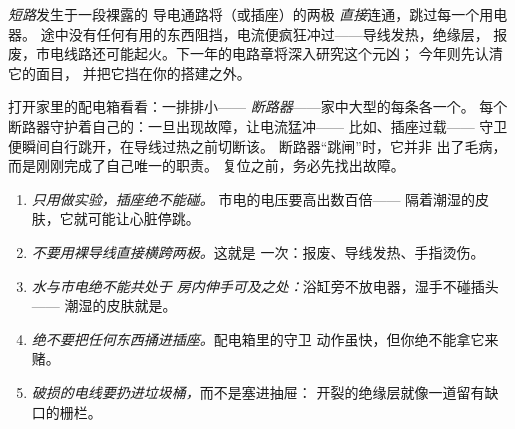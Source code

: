 \begin{definition}[短路]\label{def:g6:circuits-and-safety:short}
\emph{短路}发生于一段裸露的
导电通路将（或插座）的两极
\emph{直接}连通，跳过每一个用电器。
途中没有任何有用的东西阻挡，电流便疯狂冲过——导线发热，绝缘层，
报废，市电线路还可能起火。下一年的电路章将深入研究这个元凶；
今年则先认清它的面目，
并把它挡在你的搭建之外。
\end{definition}

\begin{remark}[家中的守卫]\label{rem:g6:circuits-and-safety:guards}
打开家里的配电箱看看：一排排小——
\emph{断路器}——家中大型的每条各一个。
每个断路器守护着自己的：一旦出现故障，让电流猛冲——
比如、插座过载——
守卫便瞬间自行跳开，在导线过热之前切断该。
断路器“跳闸”时，它并非
出了毛病，而是刚刚完成了自己唯一的职责。
复位之前，务必先找出故障。
\end{remark}

\begin{remark}[规则及其理由]\label{rem:g6:circuits-and-safety:rules}
\begin{enumerate}
  \item \emph{只用做实验，插座绝不能碰。}
        市电的电压要高出数百倍——
        隔着潮湿的皮肤，它就可能让心脏停跳。
  \item \emph{不要用裸导线直接横跨两极。}这就是
        一次：报废、导线发热、手指烫伤。
  \item \emph{水与市电绝不能共处于
        房内伸手可及之处：}浴缸旁不放电器，湿手不碰插头——
        潮湿的皮肤就是。
  \item \emph{绝不要把任何东西捅进插座。}配电箱里的守卫
        动作虽快，但你绝不能拿它来赌。
  \item \emph{破损的电线要扔进垃圾桶，}而不是塞进抽屉：
        开裂的绝缘层就像一道留有缺口的栅栏。
\end{enumerate}
\end{remark}

